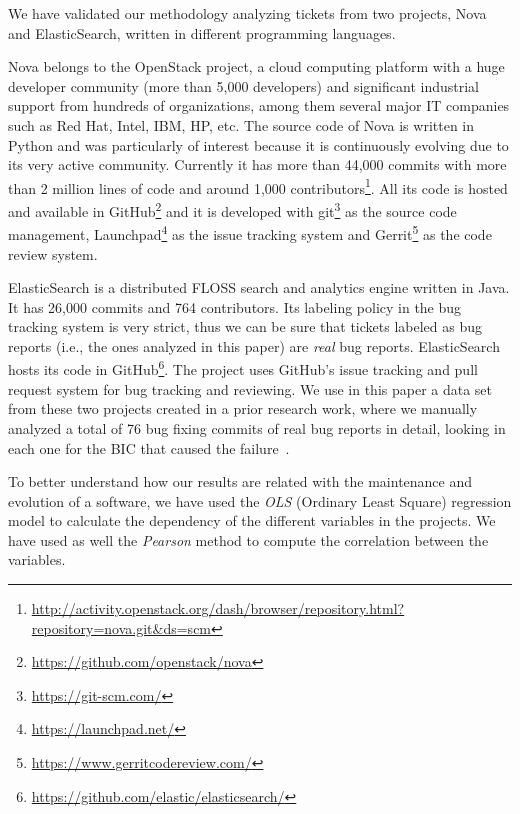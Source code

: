 \documentclass[10pt, conference]{IEEEtran}
\begin{document}
We have validated our methodology analyzing tickets from two projects, Nova and ElasticSearch, written in different programming languages. %

Nova belongs to the OpenStack project, a cloud computing platform with a huge developer community (more than 5,000 developers) and significant industrial support from hundreds of organizations, among them several major IT companies such as Red Hat, Intel, IBM, HP, etc. The source code of Nova is written in Python and was particularly of interest because it is continuously evolving due to its very active community. Currently it has more than 44,000 commits with more than 2 million lines of code and around 1,000 contributors\footnote{\url{http://activity.openstack.org/dash/browser/repository.html?repository=nova.git&ds=scm}}. All its code is hosted and available in GitHub\footnote{\url{https://github.com/openstack/nova}} and it is developed with git\footnote{\url{https://git-scm.com/}} as the source code management, Launchpad\footnote{\url{https://launchpad.net/}} as the issue tracking system and Gerrit\footnote{\url{https://www.gerritcodereview.com/}} as the code review system.

ElasticSearch is a distributed FLOSS search and analytics engine written in Java. It has 26,000 commits and 764 contributors. Its labeling policy in the bug tracking system is very strict, thus we can be sure that tickets labeled as bug reports (i.e., the ones analyzed in this paper) are \emph{real} bug reports. ElasticSearch hosts its code in GitHub\footnote{\url{https://github.com/elastic/elasticsearch/}}. The project uses GitHub's issue tracking and pull request system for bug tracking and reviewing.
We use in this paper a data set from these two projects created in a prior research work, where we manually analyzed a total of 76 bug fixing commits of real bug reports in detail, looking in each one for the BIC that caused the failure~\cite{gema2016doctoral}. %

To better understand how our results are related with the maintenance and evolution of a software, we have used the \emph{OLS} (Ordinary Least Square) regression model to calculate the dependency of the different variables in the projects. We have used as well the \emph{Pearson} method to compute the correlation between the variables.
\end{document}

